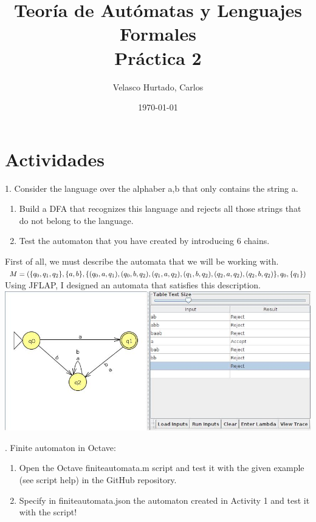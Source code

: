 \documentclass[fleqn, 10pt]{article}
\title{Teoría de Autómatas y Lenguajes Formales\\[.4\baselineskip]Práctica 2}
\author{Velasco Hurtado, Carlos}
\date{\today}
\theoremstyle{plain}
\theoremstyle{definition}
\begin{document}
\maketitle

\section{Actividades}

1. Consider the language over the alphaber {a,b} that only contains the string a.
  
\begin{enumerate}[label=\alph{enumi})]
  \item Build a DFA that recognizes this language and rejects all those strings that do not belong to the language.
  \item Test the automaton that you have created by introducing 6 chains.
  
\end{enumerate}

First of all, we must describe the automata that we will be working with.
\\

$M=(\{q_0,q_1,q_2\}, \{a,b\}, \{(q_0, a, q_1),(q_0, b, q_2), (q_1, a, q_2), (q_1, b, q_2), 
\\(q_2, a, q_2), (q_2, b, q_2)\}, q_0, \{q_1\})$
\\

Using JFLAP, I designed an automata that satisfies this description.\\

\includegraphics[width=\textwidth]{Automata.jpg}

. Finite automaton in Octave:

\begin{enumerate}[label=\alph{enumi})]
  \item Open the Octave finiteautomata.m script and test it with the given example (see script help) in the GitHub repository.
  \item Specify in finiteautomata.json the automaton created in Activity 1 and test it with the script!
  
\end{enumerate}
\end{document}
